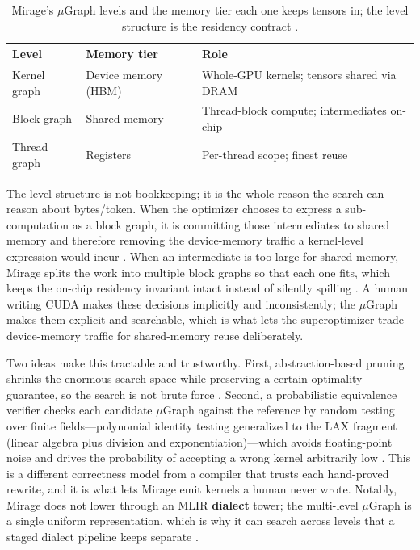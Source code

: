 \begin{table}[t]
\centering
\caption{Mirage's $\mu$Graph levels and the memory tier each one keeps tensors in; the level structure is the residency contract \citep{wu2024mirage}.}
\label{tab:ch20_mugraph_levels}
\begin{tabular}{lll}
\toprule
Level & Memory tier & Role \\
\midrule
Kernel graph & Device memory (HBM) & Whole-GPU kernels; tensors shared via DRAM \\
Block graph & Shared memory & Thread-block compute; intermediates on-chip \\
Thread graph & Registers & Per-thread scope; finest reuse \\
\bottomrule
\end{tabular}
\end{table}

The level structure is not bookkeeping; it is the whole reason the search can reason about bytes/token. When the optimizer chooses to express a sub-computation as a block graph, it is committing those intermediates to shared memory and therefore removing the device-memory traffic a kernel-level expression would incur \citep{wu2024mirage,memoryfloor2026}. When an intermediate is too large for shared memory, Mirage splits the work into multiple block graphs so that each one fits, which keeps the on-chip residency invariant intact instead of silently spilling \citep{wu2024mirage}. A human writing CUDA makes these decisions implicitly and inconsistently; the $\mu$Graph makes them explicit and searchable, which is what lets the superoptimizer trade device-memory traffic for shared-memory reuse deliberately.

Two ideas make this tractable and trustworthy. First, abstraction-based pruning shrinks the enormous search space while preserving a certain optimality guarantee, so the search is not brute force \citep{wu2024mirage}. Second, a probabilistic equivalence verifier checks each candidate $\mu$Graph against the reference by random testing over finite fields---polynomial identity testing generalized to the LAX fragment (linear algebra plus division and exponentiation)---which avoids floating-point noise and drives the probability of accepting a wrong kernel arbitrarily low \citep{wu2024mirage}. This is a different correctness model from a compiler that trusts each hand-proved rewrite, and it is what lets Mirage emit kernels a human never wrote. Notably, Mirage does not lower through an MLIR \textbf{dialect} tower; the multi-level $\mu$Graph is a single uniform representation, which is why it can search across levels that a staged dialect pipeline keeps separate \citep{lai2023relax,wu2024mirage}.


